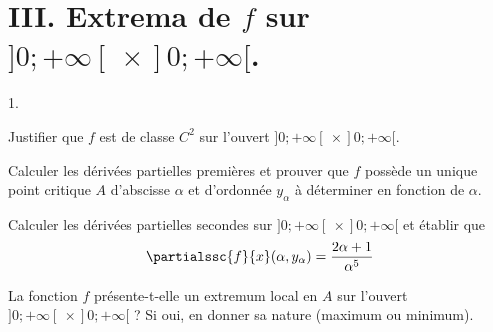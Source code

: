 \documentclass[11pt]{article}%
\begin{document}
\section*{III. Extrema de $f$ sur $]0; + \infty[ \ \times ]0 ; + \infty
[$. }

\begin{noliste}{1.}
 \setlength{\itemsep}{4mm}

\item Justifier que $f$ est de classe $C^{2}$ sur l'ouvert $]0 ; +
\infty[ \ \times ]0 ; + \infty[ $. \\

\item Calculer les dérivées partielles premières et prouver que $f$
possède un unique point critique $A$ d'abscisse $\alpha$ et d'ordonnée
$y_{\alpha}$ à déterminer en fonction de $\alpha$. \\

\item Calculer les dérivées partielles secondes sur $]0; + \infty[ \
\times ] 0 ; + \infty[$ et établir que
\[
 \partialssc{f}{x} (\alpha, y_{\alpha} ) = \frac{ 2 \alpha +
1}{\alpha^{5}} 
\]

\item La fonction $f$ présente-t-elle un extremum local en $A$ sur
l'ouvert $]0; + \infty[ \ \times ]0 ; + \infty[$ ? Si oui, en donner sa
nature (maximum ou minimum).

\end{noliste}
\end{document}
